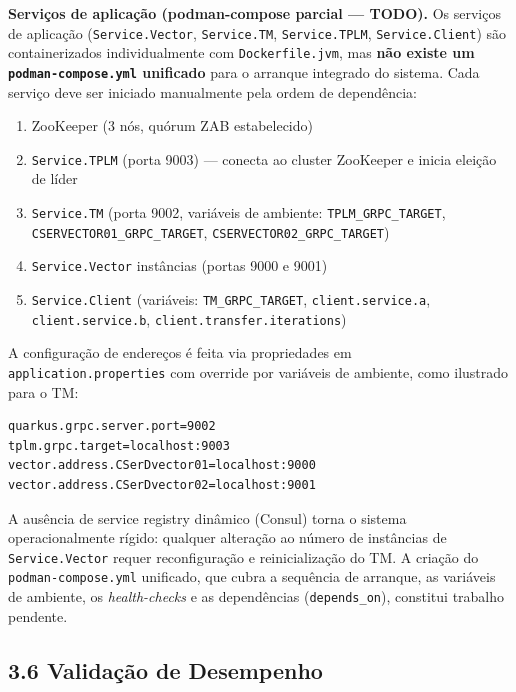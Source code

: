 \textbf{Serviços de aplicação (podman-compose parcial --- TODO).}
Os serviços de aplicação (\texttt{Service.Vector}, \texttt{Service.TM},
\texttt{Service.TPLM}, \texttt{Service.Client}) são containerizados individualmente
com \texttt{Dockerfile.jvm}, mas \textbf{não existe um \texttt{podman-compose.yml}
unificado} para o arranque integrado do sistema. Cada serviço deve ser iniciado
manualmente pela ordem de dependência:

\begin{enumerate}[label=\alph*)]
  \item ZooKeeper (3 nós, quórum ZAB estabelecido)
  \item \texttt{Service.TPLM} (porta 9003) --- conecta ao cluster ZooKeeper e inicia eleição de líder
  \item \texttt{Service.TM} (porta 9002, variáveis de ambiente: \texttt{TPLM\_GRPC\_TARGET},
        \texttt{CSERVECTOR01\_GRPC\_TARGET}, \texttt{CSERVECTOR02\_GRPC\_TARGET})
  \item \texttt{Service.Vector} instâncias (portas 9000 e 9001)
  \item \texttt{Service.Client} (variáveis: \texttt{TM\_GRPC\_TARGET},
        \texttt{client.service.a}, \texttt{client.service.b},
        \texttt{client.transfer.iterations})
\end{enumerate}

A configuração de endereços é feita via propriedades em \texttt{application.properties}
com override por variáveis de ambiente, como ilustrado para o TM:

\begin{lstlisting}[language={}, caption={Configuração estática de endereços no \texttt{application.properties} do TM.}]
quarkus.grpc.server.port=9002
tplm.grpc.target=localhost:9003
vector.address.CSerDvector01=localhost:9000
vector.address.CSerDvector02=localhost:9001
\end{lstlisting}

A ausência de service registry dinâmico (Consul) torna o sistema operacionalmente rígido:
qualquer alteração ao número de instâncias de \texttt{Service.Vector} requer reconfiguração
e reinicialização do TM. A criação do \texttt{podman-compose.yml} unificado, que cubra a
sequência de arranque, as variáveis de ambiente, os \textit{health-checks} e as dependências
(\texttt{depends\_on}), constitui trabalho pendente.

\subsection*{3.6 Validação de Desempenho}

